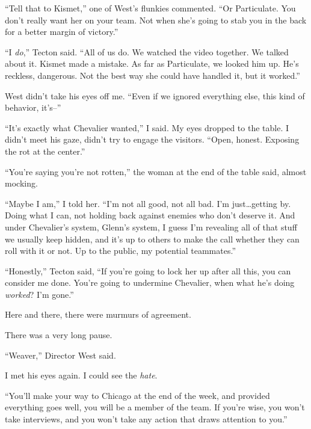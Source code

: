 ``Tell that to Kismet,'' one of West's flunkies commented.  ``Or Particulate.  You don't really want her on your team.  Not when she's going to stab you in the back for a better margin of victory.''



``I \emph{do},'' Tecton said.  ``All of us do.  We watched the video together.  We talked about it.  Kismet made a mistake.  As far as Particulate, we looked him up.  He's reckless, dangerous.  Not the best way she could have handled it, but it worked.''



West didn't take his eyes off me.  ``Even if we ignored everything else, this kind of behavior, it's--''



``It's exactly what Chevalier wanted,'' I said.  My eyes dropped to the table.  I didn't meet his gaze, didn't try to engage the visitors.  ``Open, honest.  Exposing the rot at the center.''



``You're saying you're not rotten,'' the woman at the end of the table said, almost mocking.



``Maybe I am,'' I told her.  ``I'm not all good, not all bad.  I'm just\ldots getting by.  Doing what I can, not holding back against enemies who don't deserve it.  And under Chevalier's system, Glenn's system, I guess I'm revealing all of that stuff we usually keep hidden, and it's up to others to make the call whether they can roll with it or not.  Up to the public, my potential teammates.''



``Honestly,'' Tecton said, ``If you're going to lock her up after all this, you can consider me done.  You're going to undermine Chevalier, when what he's doing \emph{worked}?  I'm gone.''



Here and there, there were murmurs of agreement.



There was a very long pause.



``Weaver,'' Director West said.



I met his eyes again.  I could see the \emph{hate}.



``You'll make your way to Chicago at the end of the week, and provided everything goes well, you will be a member of the team.  If you're wise, you won't take interviews, and you won't take any action that draws attention to you.''



